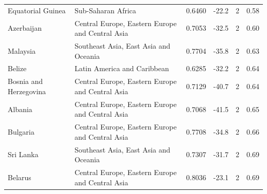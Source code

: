 \begin{tabular}{llrrrr}
Equatorial Guinea & Sub-Saharan Africa & 0.6460 & -22.2 & 2 & 0.58 \\
Azerbaijan & Central Europe, Eastern Europe and Central Asia & 0.7053 & -32.5 & 2 & 0.60 \\
Malaysia & Southeast Asia, East Asia and Oceania & 0.7704 & -35.8 & 2 & 0.63 \\
Belize & Latin America and Caribbean & 0.6285 & -32.2 & 2 & 0.64 \\
Bosnia and Herzegovina & Central Europe, Eastern Europe and Central Asia & 0.7129 & -40.7 & 2 & 0.64 \\
Albania & Central Europe, Eastern Europe and Central Asia & 0.7068 & -41.5 & 2 & 0.65 \\
Bulgaria & Central Europe, Eastern Europe and Central Asia & 0.7708 & -34.8 & 2 & 0.66 \\
Sri Lanka & Southeast Asia, East Asia and Oceania & 0.7307 & -31.7 & 2 & 0.69 \\
Belarus & Central Europe, Eastern Europe and Central Asia & 0.8036 & -23.1 & 2 & 0.69 \\
\bottomrule
\end{tabular}
